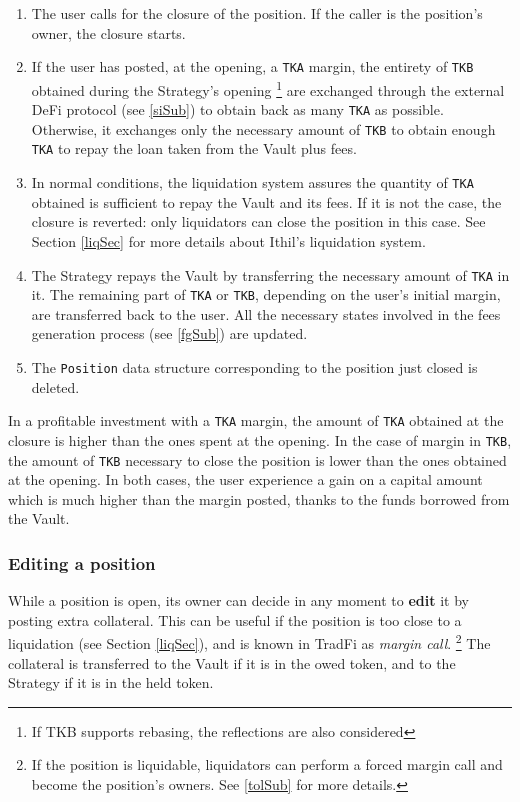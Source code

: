 \documentclass[a4paper,10 pt]{article}
\theoremstyle{definition}
\begin{document}
\begin{enumerate}
\item The user calls for the closure of the position. If the caller is the position's owner, the closure starts.
\item If the user has posted, at the opening, a \verb|TKA| margin, the entirety of \verb|TKB| obtained during the Strategy's opening \footnote{If TKB supports rebasing, the reflections are also considered} are exchanged through the external DeFi protocol (see \ref{siSub}) to obtain back as many \verb|TKA| as possible. Otherwise, it exchanges only the necessary amount of \verb|TKB| to obtain enough \verb|TKA| to repay the loan taken from the Vault plus fees.
\item In normal conditions, the liquidation system assures the quantity of \verb|TKA| obtained is sufficient to repay the Vault and its fees. If it is not the case, the closure is reverted: only liquidators can close the position in this case. See Section \ref{liqSec} for more details about Ithil's liquidation system.
\item The Strategy repays the Vault by transferring the necessary amount of \verb|TKA| in it. The remaining part of \verb|TKA| or \verb|TKB|, depending on the user's initial margin, are transferred back to the user. All the necessary states involved in the fees generation process (see \ref{fgSub}) are updated.
\item The \verb|Position| data structure corresponding to the position just closed is deleted.
\end{enumerate}

In a profitable investment with a \verb|TKA| margin, the amount of \verb|TKA| obtained at the closure is higher than the ones spent at the opening. In the case of margin in \verb|TKB|, the amount of \verb|TKB| necessary to close the position is lower than the ones obtained at the opening. In both cases, the user experience a gain on a capital amount which is much higher than the margin posted, thanks to the funds borrowed from the Vault.

\subsubsection{Editing a position}\label{editSubSub}

While a position is open, its owner can decide in any moment to {\bf edit} it by posting extra collateral. This can be useful if the position is too close to a liquidation (see Section \ref{liqSec}), and is known in TradFi as {\it margin call}. \footnote{If the position is liquidable, liquidators can perform a forced margin call and become the position's owners. See \ref{tolSub} for more details.} The collateral is transferred to the Vault if it is in the owed token, and to the Strategy if it is in the held token.
\end{document}
